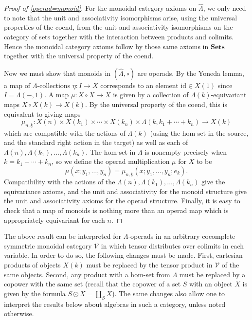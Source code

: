 \documentclass{amsbook} %
\newcommand{\mb}{\mathbf}
\numberwithin{section}{chapter}
\begin{document}
\begin{proof}[Proof of \ref{operad=monoid}]
For the monoidal category axioms on $\hat{\mathbb{\Lambda}}$, we only need to note that the unit and associativity isomorphisms arise, using the universal properties of the coend, from the unit and associativity isomorphisms on the category of sets together with the interaction between products and colimits.  Hence the monoidal category axioms follow by those same axioms in $\mb{Sets}$ together with the universal property of the coend.

Now we must show that monoids in $(\hat{\mathbb{\Lambda}}, \circ)$ are operads.  By the Yoneda lemma, a map of $\Lambda$-collections $\eta: I \rightarrow X$ corresponds to an element $\textrm{id} \in X(1)$ since $I = \mathbb{\Lambda}(-,1)$.  A map $\mu:X \circ X \rightarrow X$ is given by a collection of $\Lambda(k)$-equivariant maps $X \circ X (k) \rightarrow X(k)$.  By the universal property of the coend, this is equivalent to giving maps
\[
\mu_{n, \underline{k}}:X(n) \times X(k_{1}) \times \cdots \times X(k_{n}) \times \mathbb{\Lambda}(k, k_{1}+\cdots +k_{n}) \rightarrow X(k)
\]
which are compatible with the actions of $\Lambda(k)$ (using the hom-set in the source, and the standard right action in the target) as well as each of $\Lambda(n), \Lambda(k_{1}), \ldots, \Lambda(k_{n})$.  The hom-set in $\mathbb{\Lambda}$ is nonempty precisely when $k=k_{1} + \cdots + k_{n}$, so we define the operad multiplication $\mu$ for $X$ to be
\[
\mu (x; y_{1}, \ldots, y_{n}) = \mu_{n, \underline{k}}(x; y_{1}, \ldots, y_{n}; e_{k}).
\]
Compatibility with the actions of the  $\Lambda(n), \Lambda(k_{1}), \ldots, \Lambda(k_{n})$ give the equivariance axioms, and the unit and associativity for the monoid structure give the unit and associativity axioms for the operad structure.  Finally, it is easy to check that a map of monoids is nothing more than an operad map which is appropriately equivariant for each $n$.
\end{proof}

\begin{rem}
The above result can be interpreted for $\Lambda$-operads in an arbitrary cocomplete symmetric monoidal category $\mathcal{V}$ in which tensor distributes over colimits in each variable.  In order to do so, the following changes must be made.  First, cartesian products of objects $X(k)$ must be replaced by the tensor product in $\mathcal{V}$ of the same objects.  Second, any product with a hom-set from $\mathbb{\Lambda}$ must be replaced by a copower with the same set (recall that the copower of a set $S$ with an object $X$ is given by the formula $S \odot X = \coprod_{S} X$).  The same changes also allow one to interpret the results below about algebras in such a category, unless noted otherwise.
\end{rem}
\end{document}
